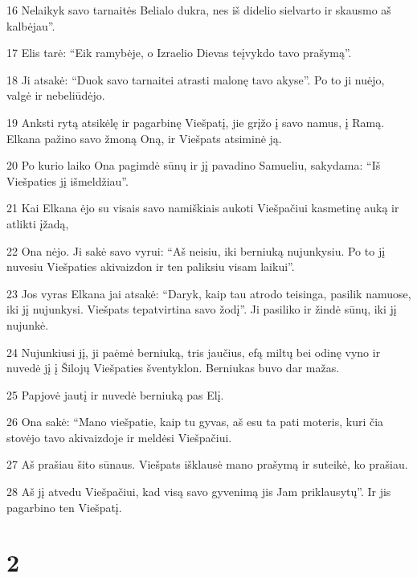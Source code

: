 \par 16 Nelaikyk savo tarnaitės Belialo dukra, nes iš didelio sielvarto ir skausmo aš kalbėjau”. 
\par 17 Elis tarė: “Eik ramybėje, o Izraelio Dievas teįvykdo tavo prašymą”. 
\par 18 Ji atsakė: “Duok savo tarnaitei atrasti malonę tavo akyse”. Po to ji nuėjo, valgė ir nebeliūdėjo. 
\par 19 Anksti rytą atsikėlę ir pagarbinę Viešpatį, jie grįžo į savo namus, į Ramą. Elkana pažino savo žmoną Oną, ir Viešpats atsiminė ją. 
\par 20 Po kurio laiko Ona pagimdė sūnų ir jį pavadino Samueliu, sakydama: “Iš Viešpaties jį išmeldžiau”. 
\par 21 Kai Elkana ėjo su visais savo namiškiais aukoti Viešpačiui kasmetinę auką ir atlikti įžadą, 
\par 22 Ona nėjo. Ji sakė savo vyrui: “Aš neisiu, iki berniuką nujunkysiu. Po to jį nuvesiu Viešpaties akivaizdon ir ten paliksiu visam laikui”. 
\par 23 Jos vyras Elkana jai atsakė: “Daryk, kaip tau atrodo teisinga, pasilik namuose, iki jį nujunkysi. Viešpats tepatvirtina savo žodį”. Ji pasiliko ir žindė sūnų, iki jį nujunkė. 
\par 24 Nujunkiusi jį, ji paėmė berniuką, tris jaučius, efą miltų bei odinę vyno ir nuvedė jį į Šilojų Viešpaties šventyklon. Berniukas buvo dar mažas. 
\par 25 Papjovė jautį ir nuvedė berniuką pas Elį. 
\par 26 Ona sakė: “Mano viešpatie, kaip tu gyvas, aš esu ta pati moteris, kuri čia stovėjo tavo akivaizdoje ir meldėsi Viešpačiui. 
\par 27 Aš prašiau šito sūnaus. Viešpats išklausė mano prašymą ir suteikė, ko prašiau. 
\par 28 Aš jį atvedu Viešpačiui, kad visą savo gyvenimą jis Jam priklausytų”. Ir jis pagarbino ten Viešpatį.


\chapter{2}


